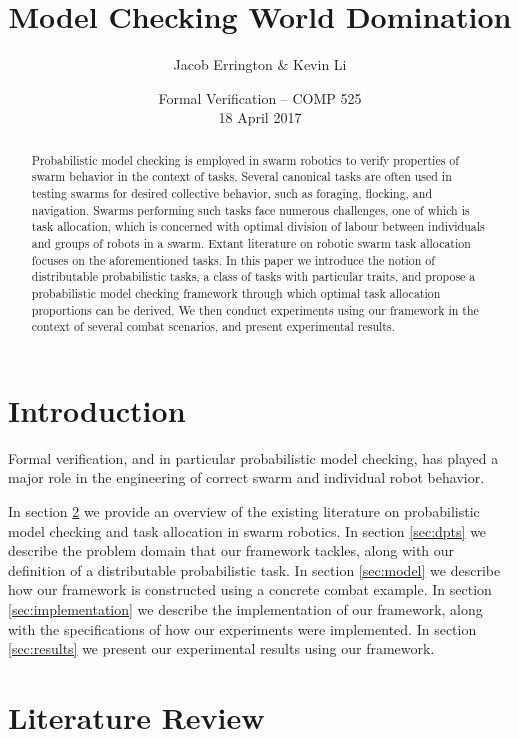 \documentclass[11pt]{article}
\title{Model Checking World Domination}
\author{Jacob Errington \& Kevin Li}
\date{Formal Verification -- COMP 525\\18 April 2017}
\theoremstyle{definition}
\begin{document}
\maketitle

\begin{abstract}
    Probabilistic model checking is employed
    in swarm robotics to verify
    properties of swarm behavior in the context of
    tasks. Several canonical tasks are often used
    in testing swarms for desired collective behavior,
    such as foraging, flocking, and navigation.
    Swarms performing such tasks face numerous challenges,
    one of which is task allocation, which is concerned 
    with optimal division of labour between individuals 
    and groups of robots in a swarm.  Extant literature 
    on robotic swarm task allocation focuses on the 
    aforementioned tasks. In this paper we introduce the
    notion of distributable probabilistic tasks,
    a class of tasks with particular traits, and
    propose a probabilistic model checking framework
    through which optimal task allocation proportions
    can be derived. We then conduct experiments using our
    framework in the context of several combat scenarios,
    and present experimental results.
\end{abstract}

\section{Introduction}\label{sec:intro}

Formal verification, and in particular probabilistic model
checking, has played a major role in the engineering of
correct swarm and individual robot behavior. %

In section \ref{sec:lit-review} we provide an overview of the
existing literature on probabilistic model checking and
task allocation in swarm robotics. In section \ref{sec:dpts}
we describe the problem domain that our framework tackles,
along with our definition of a distributable probabilistic
task. In section \ref{sec:model} we describe how our framework
is constructed using a concrete combat example. In section
\ref{sec:implementation} we describe the implementation of
our framework, along with the specifications of how our
experiments were implemented. In section \ref{sec:results}
we present our experimental results using our framework.

\section{Literature Review}\label{sec:lit-review}
\end{document}

